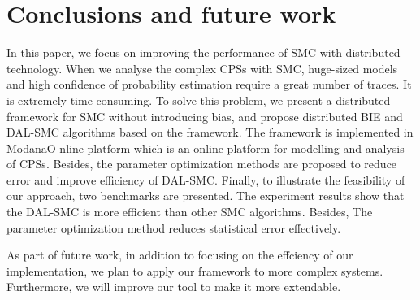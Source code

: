 \section{Conclusions and future work}
In this paper, we focus on improving the performance of SMC with distributed technology. When we analyse the complex CPSs with SMC, huge-sized models and high confidence of probability estimation require a great number of traces. It is extremely time-consuming. To solve this problem, we present a distributed framework for SMC without introducing bias, and propose distributed BIE and DAL-SMC algorithms based on the framework. The framework is implemented in ModanaO
nline platform which is an online platform for modelling and analysis of CPSs. Besides, the parameter optimization methods are proposed to reduce error and improve efficiency of DAL-SMC. Finally, to illustrate the feasibility of our approach, two benchmarks are presented. The experiment results show that the DAL-SMC is more efficient than other SMC algorithms. Besides, The parameter optimization method reduces statistical error effectively. 

As part of future work, in addition to focusing on the effciency of our implementation, we plan to apply our framework to more complex systems. Furthermore, we will improve our tool to make it more extendable.




